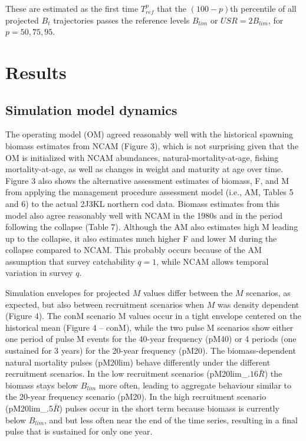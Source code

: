 \documentclass[12pt,]{article}
\begin{document}
These are estimated as the first time \(T_{ref}^{p}\) that the
\((100 - p)\)th percentile of all projected \(B_t\) trajectories passes
the reference levels \(B_{lim}\) or \(USR = 2B_{lim}\), for
\(p = 50, 75, 95\).

\section{Results}\label{results}

\subsection{Simulation model dynamics}\label{simulation-model-dynamics}

The operating model (OM) agreed reasonably well with the historical
spawning biomass estimates from NCAM (Figure 3), which is not surprising
given that the OM is initialized with NCAM abundances,
natural-mortality-at-age, fishing mortality-at-age, as well as changes
in weight and maturity at age over time. Figure 3 also shows the
alternative assessment estimates of biomass, F, and M from applying the
management procedure assessment model (i.e., AM, Tables 5 and 6) to the
actual 2J3KL northern cod data. Biomass estimates from this model also
agree reasonably well with NCAM in the 1980s and in the period following
the collapse (Table 7). Although the AM also estimates high M leading up
to the collapse, it also estimates much higher F and lower M during the
collapse compared to NCAM. This probably occurs because of the AM
assumption that survey catchability \(q = 1\), while NCAM allows
temporal variation in survey \(q\).

Simulation envelopes for projected \(M\) values differ between the \(M\)
scenarios, as expected, but also between recruitment scenarios when
\(M\) was density dependent (Figure 4). The conM scenario M values occur
in a tight envelope centered on the historical mean (Figure 4 -- conM),
while the two pulse M scenarios show either one period of pulse M events
for the 40-year frequency (pM40) or 4 periods (one sustained for 3
years) for the 20-year frequency (pM20). The biomass-dependent natural
mortality pulses (pM20lim) behave differently under the different
recruitment scenarios. In the low recruitment scenarios
(pM20lim\_\(.16\bar{R}\)) the biomass stays below \(B_{lim}\) more
often, leading to aggregate behaviour similar to the 20-year frequency
scenario (pM20). In the high recruitment scenario
(pM20lim\_.5\(\bar{R}\)) pulses occur in the short term because biomass
is currently below \(B_{lim}\), and but less often near the end of the
time series, resulting in a final pulse that is sustained for only one
year.
\end{document}
